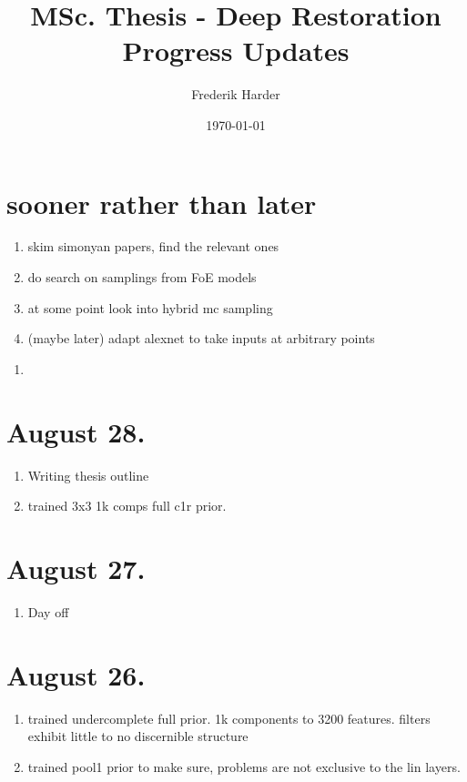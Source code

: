 \documentclass{article}
\title{MSc. Thesis - Deep Restoration\\Progress Updates}
\date{\today}
\author{Frederik Harder}
\begin{document}
\maketitle

\section*{sooner rather than later}

\begin{enumerate}
	\item skim simonyan papers, find the relevant ones
	\item do search on samplings from FoE models
	\item at some point look into hybrid mc sampling
	\item (maybe later) adapt alexnet to take inputs at arbitrary points
\end{enumerate}

\begin{enumerate}
	\item 
\end{enumerate}



\section{August 28.}

\begin{enumerate}
	\item Writing thesis outline
	\item trained 3x3 1k comps full c1r prior.
\end{enumerate}



\section{August 27.}

\begin{enumerate}
	\item Day off
\end{enumerate}

\section{August 26.}

\begin{enumerate}
	\item trained undercomplete full prior. 1k components to 3200 features. filters exhibit little to no discernible structure
	\item trained pool1 prior to make sure, problems are not exclusive to the lin layers.
\end{enumerate}
\end{document}
